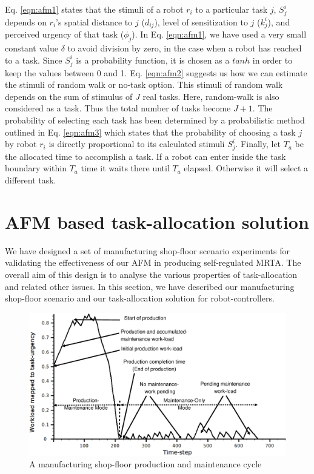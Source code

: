 \documentclass[final,5p,times,twocolumn]{elsarticle}
\begin{document}
Eq. \ref{eqn:afm1} states that the stimuli of a robot $r_i$ to a particular task $j$, $S^{i}_{j}$ depends on $r_i$'s spatial distance to $j$ ($d_{ij}$), level of sensitization to $j$ ($k_{j}^{i}$), and perceived urgency of that task ($\phi _{j}$). In  Eq. \ref{eqn:afm1}, we have used a very small constant value $\delta$ to avoid division by zero, in the case when a robot has reached to a task. Since $S^{i}_{j}$ is a probability function, it is chosen as a $tanh$ in order to keep the values between 0 and 1. Eq. \ref{eqn:afm2} suggests us how we can estimate the stimuli of random walk or no-task option. This stimuli of random walk depends on the sum of stimulus of $J$ real tasks. Here, random-walk is also considered as a task. Thus the total number of tasks become $J+1$. The probability of selecting each task has been determined by a probabilistic method outlined in Eq. \ref{eqn:afm3} which states that the probability of choosing a task $j$ by robot $r_i$ is directly proportional to its calculated stimuli $ S^i_j$. Finally, let $T_a$ be the allocated time to accomplish a task. If a robot can enter inside the task boundary within $T_a$ time it waits there until $T_a$ elapsed. Otherwise it will select a different task.
\section{AFM based task-allocation solution}
\label{sec:mrta}
We have designed a set of  manufacturing shop-floor scenario experiments for validating the effectiveness of our AFM in producing self-regulated MRTA.  The overall aim of this design is to analyse the various properties of task-allocation and related other issues. In this section, we have described our manufacturing shop-floor scenario and our task-allocation solution for robot-controllers.
\begin{figure}
\centering
\includegraphics[width=0.7\linewidth, angle=0]
{./images/VSP.eps}
\caption{A manufacturing shop-floor production and maintenance cycle}
\label{fig:vsp}  %
\end{figure}
\end{document}
